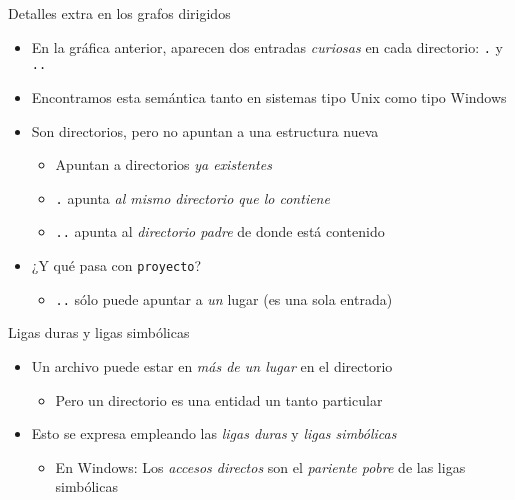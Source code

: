 \documentclass[presentation]{beamer}
\begin{document}
\begin{frame}[label={sec:org7307e9a},fragile]{Detalles extra en los grafos dirigidos}
 \begin{itemize}
\item En la gráfica anterior, aparecen dos entradas \emph{curiosas} en cada
directorio: \texttt{.} y \texttt{..}
\item Encontramos esta semántica tanto en sistemas tipo Unix como tipo
Windows
\item Son directorios, pero no apuntan a una estructura nueva
\begin{itemize}
\item Apuntan a directorios \emph{ya existentes}
\item \texttt{.} apunta \emph{al mismo directorio que lo contiene}
\item \texttt{..} apunta al \emph{directorio padre} de donde está contenido
\end{itemize}
\item ¿Y qué pasa con \texttt{proyecto}?
\begin{itemize}
\item \texttt{..} sólo puede apuntar a \emph{un} lugar (es una sola entrada)
\end{itemize}
\end{itemize}
\end{frame}

\begin{frame}[label={sec:org142c1fe}]{Ligas duras y ligas simbólicas}
\begin{itemize}
\item Un archivo puede estar en \emph{más de un lugar} en el directorio
\begin{itemize}
\item Pero un directorio es una entidad un tanto particular
\end{itemize}
\item Esto se expresa empleando las \emph{ligas duras} y \emph{ligas simbólicas}
\begin{itemize}
\item En Windows: Los \emph{accesos directos} son el \emph{pariente pobre} de las
ligas simbólicas
\end{itemize}
\end{itemize}
\end{frame}
\end{document}
